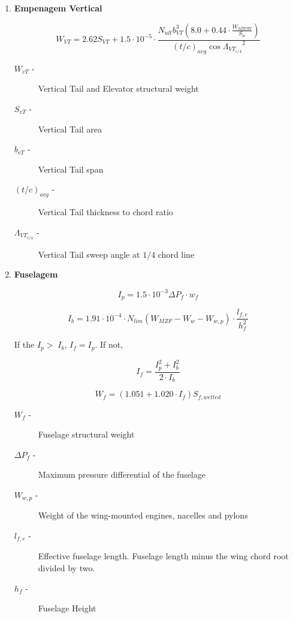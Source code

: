 \begin{enumerate}
\vspace{0.5cm}

\item \textbf{Empenagem Vertical}

\begin{equation}
W_{VT} = 2.62 S_{VT} + 1.5 \cdot 10^{-5} \cdot \frac{ N_{ult} b_{VT}^3 \left( 8.0 + 0.44 \cdot \frac{W_{MTOW}}{S_w} \right)  }{  (t/c)_{avg} \cos{\Lambda_{VT_{c/4}}}^2 }
\end{equation}

\begin{description}
\item [$W_{vT}$ -] Vertical Tail and Elevator structural weight
\item [$S_{vT}$ -] Vertical Tail area
\item [$b_{vT}$ -] Vertical Tail span
\item [$(t/c)_{avg}$ -] Vertical Tail thickness to chord ratio
\item [$\Lambda_{VT_{c/4}}$ -] Vertical Tail sweep angle at $1/4$ chord line
\end{description}

\vspace{0.5cm}

\item \textbf{Fuselagem}

\begin{equation}
I_p = 1.5 \cdot 10^{-3} \Delta P_f \cdot w_f
\end{equation}

\begin{equation}
I_b = 1.91 \cdot 10^{-4} \cdot N_{lim} (W_{MZF} - W_w - W_{w,p}) \cdot \frac{l_{f,e}}{h_f^2}
\end{equation}

If the $I_p >\;I_b$, $I_f = I_p$. If not,

\begin{equation}
I_f = \frac{I_p^2+I_b^2}{2\cdot I_b}
\end{equation}

\begin{equation}
W_f = (1.051+1.020 \cdot I_f) S_{f,wetted}
\end{equation}

\begin{description}
\item [$W_f$ -] Fuselage structural weight
\item [$\Delta P_f$ -] Maximum pressure differential of the fuselage
\item [$W_{w,p}$ -] Weight of the wing-mounted engines, nacelles and pylons
\item [$l_{f,e}$ -] Effective fuselage length. Fuselage length minus the wing chord root divided by two.
\item [$h_f$ -] Fuselage Height
\end{description}


\end{enumerate}
